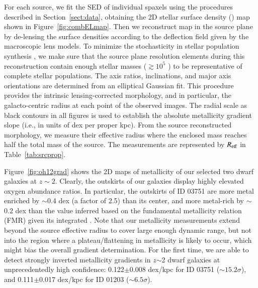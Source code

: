 For each source, we fit the SED of individual spaxels using the procedures described in Section~\ref{sect:data}, 
obtaining the 2D stellar surface density (\Sstar) map shown in Figure~\ref{fig:combELmap}. Then we reconstruct 
\Sstar map in the source plane by de-lensing the surface densities according to the deflection field given by the 
macroscopic lens models.
To minimize the stochasticity in stellar population synthesis \citep{Fouesneau:2010ea,Eldridge:2012ds}, 
we make sure that the source plane resolution elements during this reconstruction contain enough stellar masses 
($\gtrsim 10^5$ \Msun) to be representative of complete stellar populations.
The axis ratios, inclinations, and major axis orientations are determined from an elliptical Gaussian fit. This 
procedure provides the intrinsic lensing-corrected morphology, and in particular, the galacto-centric radius at 
each point of the observed images.
The radial scale as black contours in all figures is used to establish the absolute metallicity gradient slope (i.e., in units of 
dex per proper kpc).
From the source reconstructed morphology, we measure their effective radius where the enclosed mass 
reaches half the total mass of the source. The measurements are represented by $R_{\rm eff}$ in 
Table~\ref{tab:srcprop}.

Figure~\ref{fig:oh12grad} shows the 2D maps of metallicity of our selected two dwarf galaxies at $z\sim2$.
Clearly, the outskirts of our galaxies display highly elevated oxygen abundance ratios.
In particular, the outskirts of ID 03751 are more metal enriched by $\sim$0.4 dex (\ie a factor of 2.5) than its center, and more 
metal-rich by $\sim$0.2 dex than the value inferred based on the fundamental metallicity relation (FMR) given its 
integrated \Mstar \cite{2010MNRAS.408.2115M,Mannucci:2011be}.
Note that our metallicity measurements extend beyond the source effective radius to cover large enough 
dynamic range, but not into the region where a plateau/flattening in metallicity \citep[\ie, at $R>2-2.5 R_{\rm 
eff}$,][]{2014A&A...563A..49S,SanchezMenguiano:2016gj,Molla:2018em} is likely to occur, which might bias the 
overall gradient determination.
For the first time, we are able to detect strongly inverted metallicity gradients in $z$$\sim$2 dwarf galaxies
at unprecedentedly high confidence: 0.122$\pm$0.008 dex/kpc for ID 03751 ($\sim15.2\sigma$), and
0.111$\pm$0.017 dex/kpc for ID 01203 ($\sim6.5\sigma$).

